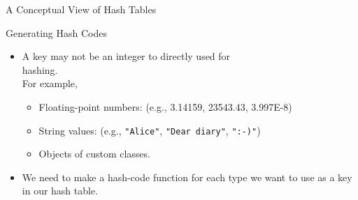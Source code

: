 \documentclass[14pt,aspectratio=1610]{beamer}
\begin{document}
\begin{frame}{A Conceptual View of Hash Tables}
\end{frame}

\begin{frame}{Generating Hash Codes}
\begin{itemize}
  \item
    A key may not be an integer to directly used for \\hashing.\\
    For example,
    \begin{itemize}
      \item Floating-point numbers: (e.g., 3.14159, 23543.43, 3.997E-8)
      \item String values: (e.g., \texttt{"Alice"}, \texttt{"Dear diary"}, \texttt{":-)"})
      \item Objects of custom classes.
    \end{itemize}
  \item
    We need to make a hash-code function for each type we want to use as a key in our hash table.
\end{itemize}
\end{frame}
\end{document}
